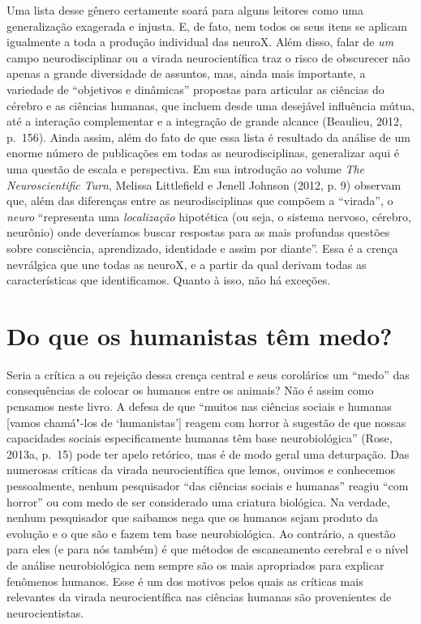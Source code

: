 Uma lista desse gênero certamente soará para alguns leitores como uma
generalização exagerada e injusta. E, de fato, nem todos os seus itens se
aplicam igualmente a toda a produção individual das neuroX. Além disso,
falar de \emph{um} campo neurodisciplinar ou \emph{a} virada
neurocientífica traz o risco de obscurecer não apenas a grande
diversidade de assuntos, mas, ainda mais importante, a variedade de
``objetivos e dinâmicas'' propostas para articular as ciências do
cérebro e as ciências humanas, que incluem desde uma desejável
influência mútua, até a interação complementar e a integração de grande
alcance (Beaulieu, 2012, p.~156). Ainda assim, além do fato de que essa
lista é resultado da análise de um enorme número de publicações em todas
as neurodisciplinas, generalizar aqui é uma questão de escala e
perspectiva. Em sua introdução ao volume \emph{The Neuroscientific
Turn}, Melissa Littlefield e Jenell Johnson (2012, p. 9) observam que,
além das diferenças entre as neurodisciplinas que compõem a ``virada'',
o \emph{neuro} ``representa uma \emph{localização} hipotética (ou seja,
o sistema nervoso, cérebro, neurônio) onde deveríamos buscar respostas
para as mais profundas questões sobre consciência, aprendizado,
identidade e assim por diante''. Essa é a crença nevrálgica que une
todas as neuroX, e a partir da qual derivam todas as características que
identificamos. Quanto à isso, não há exceções.

\section{Do que os humanistas têm medo?}

Seria a crítica a ou rejeição dessa crença central e seus corolários um
``medo'' das consequências de colocar os humanos entre os animais? Não é
assim como pensamos neste livro. A defesa de que ``muitos nas ciências
sociais e humanas {[}vamos chamá"-los de `humanistas'{]} reagem com
horror à sugestão de que nossas capacidades sociais especificamente
humanas têm base neurobiológica'' (Rose, 2013a, p.~15) pode ter apelo
retórico, mas é de modo geral uma deturpação. Das numerosas críticas da
virada neurocientífica que lemos, ouvimos e conhecemos pessoalmente,
nenhum pesquisador ``das ciências sociais e humanas'' reagiu ``com
horror'' ou com medo de ser considerado uma criatura biológica. Na
verdade, nenhum pesquisador que saibamos nega que os humanos sejam
produto da evolução e o que são e fazem tem base neurobiológica. Ao
contrário, a questão para eles (e para nós também) é que métodos de
escaneamento cerebral e o nível de análise neurobiológica nem sempre
são os mais apropriados para explicar fenômenos humanos. Esse é um dos
motivos pelos quais as críticas mais relevantes da virada neurocientífica
nas ciências humanas são provenientes de neurocientistas.

